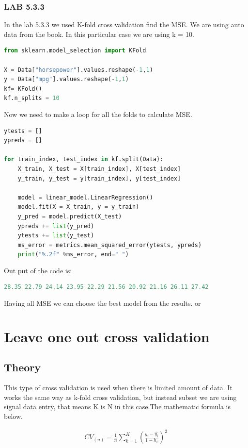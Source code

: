 \subsubsection*{LAB 5.3.3}%
In the lab 5.3.3 we used K-fold cross validation find the MSE. We are using auto data from the book. In this particular case we are using k = 10. 
\begin{lstlisting}[language=Python]
from sklearn.model_selection import KFold

X = Data["horsepower"].values.reshape(-1,1) 
y = Data["mpg"].values.reshape(-1,1)
kf= KFold()
kf.n_splits = 10
\end{lstlisting}
Now we need to make a loop for all the folds to calculate MSE.   

\begin{lstlisting}[language=Python]
ytests = []
ypreds = []

for train_index, test_index in kf.split(Data):
	X_train, X_test = X[train_index], X[test_index]
	y_train, y_test = y[train_index], y[test_index]

	model = linear_model.LinearRegression()
	model.fit(X = X_train, y = y_train)
	y_pred = model.predict(X_test)  
	ypreds += list(y_pred)
	ytests += list(y_test)
	ms_error = metrics.mean_squared_error(ytests, ypreds)
	print("%.2f" %ms_error, end=" ")
\end{lstlisting}
Out put of the code is:
\begin{lstlisting}[language=Python]
28.35 22.79 24.14 23.95 22.29 21.56 20.92 21.16 26.11 27.42 
\end{lstlisting}
Having all MSE we can choose the best model from the results. or 

\section {Leave one out cross validation}

\subsection{Theory}
This type of cross validation is used when there is limited amount of data. It works the same way as k-fold cross validation, but instead subset we are using signal data entry, that means K is N in this case.The mathematic formula is below. 

\begin{align}\label{fo:LOOCV}
CV_{(n)} = \frac {1}{n} \sum_{k=1}^{K}  (\frac {y_i-\hat{y_i}}{1- h_i})^2
\end{align}
